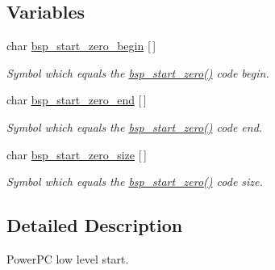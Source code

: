 \subsection*{Variables}
\begin{DoxyCompactItemize}
\item 
\mbox{\label{group__RTEMSBSPsPowerPCSharedStart_gaf57face1aaf6ded232cb769149180ec0}} 
char \mbox{\hyperlink{group__RTEMSBSPsPowerPCSharedStart_gaf57face1aaf6ded232cb769149180ec0}{bsp\+\_\+start\+\_\+zero\+\_\+begin}} \mbox{[}$\,$\mbox{]}
\begin{DoxyCompactList}\small\item\em Symbol which equals the \mbox{\hyperlink{group__RTEMSBSPsPowerPCSharedStart_ga22b00d272dd9b2ab44e34f0b86245c38}{bsp\+\_\+start\+\_\+zero()}} code begin. \end{DoxyCompactList}\item 
\mbox{\label{group__RTEMSBSPsPowerPCSharedStart_gaecb8798a00ec268ef022dd747fc5899a}} 
char \mbox{\hyperlink{group__RTEMSBSPsPowerPCSharedStart_gaecb8798a00ec268ef022dd747fc5899a}{bsp\+\_\+start\+\_\+zero\+\_\+end}} \mbox{[}$\,$\mbox{]}
\begin{DoxyCompactList}\small\item\em Symbol which equals the \mbox{\hyperlink{group__RTEMSBSPsPowerPCSharedStart_ga22b00d272dd9b2ab44e34f0b86245c38}{bsp\+\_\+start\+\_\+zero()}} code end. \end{DoxyCompactList}\item 
\mbox{\label{group__RTEMSBSPsPowerPCSharedStart_ga4d5bb66c4502940f07f99b743bd0b1e0}} 
char \mbox{\hyperlink{group__RTEMSBSPsPowerPCSharedStart_ga4d5bb66c4502940f07f99b743bd0b1e0}{bsp\+\_\+start\+\_\+zero\+\_\+size}} \mbox{[}$\,$\mbox{]}
\begin{DoxyCompactList}\small\item\em Symbol which equals the \mbox{\hyperlink{group__RTEMSBSPsPowerPCSharedStart_ga22b00d272dd9b2ab44e34f0b86245c38}{bsp\+\_\+start\+\_\+zero()}} code size. \end{DoxyCompactList}\end{DoxyCompactItemize}


\subsection{Detailed Description}
Power\+PC low level start. 



